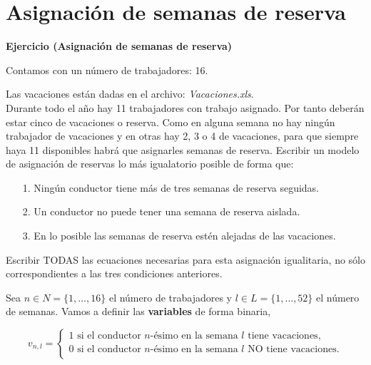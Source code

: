 \documentclass[a4paper,12pt]{article}
\newenvironment{exercise}[1]%
{%
  \par\vspace{\baselineskip}\noindent
  \textbf{Ejercicio (#1)}\begin{itshape}%
  \par\vspace{\baselineskip}\noindent\ignorespaces
}%
{%
  \end{itshape}\ignorespacesafterend
}
\begin{document}
\pagebreak
\tableofcontents
\pagebreak


\section{Asignaci\'on de semanas de reserva}
\begin{exercise}{Asignaci\'on de semanas de reserva}
Contamos con un n\'umero de trabajadores: 16.

Las vacaciones est\'an dadas en el archivo: \textit{Vacaciones.xls}.\\

Durante todo el año hay 11 trabajadores con trabajo asignado. Por tanto deber\'an estar cinco de vacaciones o reserva. Como en alguna semana no hay ning\'un trabajador de vacaciones y en otras hay 2, 3 o 4 de vacaciones, para que siempre haya 11 disponibles habr\'a que asignarles semanas de reserva. Escribir un modelo de asignaci\'on de reservas lo m\'as igualatorio posible de forma que:\\

\begin{itemize}
\item[1.] Ning\'un conductor tiene m\'as de tres semanas de reserva seguidas. \\%

\item[2.] Un conductor no puede tener una semana de reserva aislada. \\%

\item[3.] En lo posible las semanas de reserva est\'en alejadas de las vacaciones.\\ %
\end{itemize}

Escribir TODAS las ecuaciones necesarias para esta asignaci\'on igualitaria, no s\'olo correspondientes a las tres condiciones anteriores.\\
\end{exercise}

Sea $n\in N = \{ 1,\dots,16 \}$ el n\'umero de trabajadores y $l \in L = \{1,\dots,52\}$ el n\'umero de semanas. Vamos a definir las \textbf{variables} de forma binaria,

	\begin{equation*}
	v_{n,l} = \left\lbrace \begin{array}{l}
		1 \text{ si el conductor } n\text{-\'esimo en la semana } l \text{  tiene vacaciones,} \\
		0 \text{ si el conductor } n\text{-\'esimo en la semana } l \text{ NO tiene vacaciones.} \\
	\end{array}
	\right. 
	\end{equation*}
	
\end{document}
